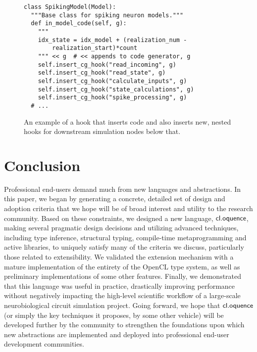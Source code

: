 \documentclass[10pt, conference, compsocconf]{IEEEtran}
\begin{document}
\begin{figure}\small{
\begin{verbatim}
class SpikingModel(Model):
  """Base class for spiking neuron models."""
  def in_model_code(self, g):
    """
    idx_state = idx_model + (realization_num - 
        realization_start)*count
    """ << g  # << appends to code generator, g
    self.insert_cg_hook("read_incoming", g)
    self.insert_cg_hook("read_state", g)
    self.insert_cg_hook("calculate_inputs", g)
    self.insert_cg_hook("state_calculations", g)
    self.insert_cg_hook("spike_processing", g)
  # ...
\end{verbatim}}
\caption{An example of a hook that inserts code and also inserts new, nested hooks for downstream simulation nodes  below that.}
\label{impl}
\end{figure}

\section{Conclusion}
Professional end-users demand much from new languages and abstractions. In this paper, we began by generating a concrete, detailed set of design and adoption criteria that we hope will be of broad interest and utility to the research community. Based on these constraints, we designed a new language, $\textsf{cl.oquence}$, making several pragmatic design decisions and utilizing advanced techniques, including type inference, structural typing, compile-time metaprogramming and active libraries, to uniquely satisfy many of the criteria we discuss, particularly those related to extensibility. We validated the extension mechanism with a mature implementation of  the entirety of the OpenCL type system, as well as preliminary implementations of some other features. Finally, we demonstrated that this language was useful in practice, drastically improving performance without negatively impacting the high-level scientific workflow of a large-scale neurobiological circuit simulation project. Going forward, we hope that $\textsf{cl.oquence}$ (or simply the key techniques it proposes, by some other vehicle) will be developed further by the community to strengthen the foundations upon which new abstractions are implemented and deployed into professional end-user development communities.
\end{document}
